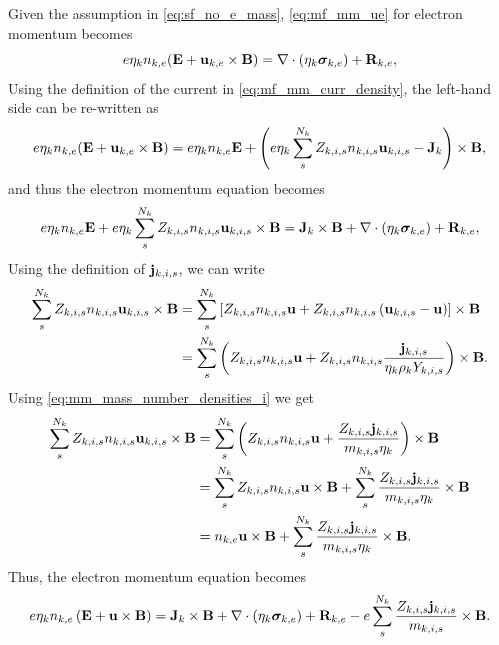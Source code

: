 \documentclass[a4paper,11pt]{report}
\begin{document}
Given the assumption in \cref{eq:sf_no_e_mass}, \cref{eq:mf_mm_ue} for electron momentum becomes
\begin{equation*}
    e \eta_k n_{k,e} ( \mathbf{E} + \mathbf{u}_{k,e} \times \mathbf{B} ) = \nabla \cdot \left( \eta_k \bm \sigma_{k,e} \right) + \mathbf{R}_{k,e},
\end{equation*}
Using the definition of the current in \cref{eq:mf_mm_curr_density}, the left-hand side can be re-written as
\begin{equation*}
    e \eta_k n_{k,e} ( \mathbf{E} + \mathbf{u}_{k,e} \times \mathbf{B} ) = e \eta_k n_{k,e} \mathbf{E} + \left( e \eta_k \sum_s^{N_k} Z_{k,i,s} n_{k,i,s} \mathbf{u}_{k,i,s} - \mathbf{J}_k \right) \times \mathbf{B},
\end{equation*}
and thus the electron momentum equation becomes
\begin{equation*}
    e \eta_k n_{k,e} \mathbf{E} + e \eta_k \sum_s^{N_k} Z_{k,i,s} n_{k,i,s} \mathbf{u}_{k,i,s} \times \mathbf{B} = \mathbf{J}_k \times \mathbf{B} + \nabla \cdot \left( \eta_k \bm \sigma_{k,e} \right) + \mathbf{R}_{k,e},
\end{equation*}
Using the definition of $\mathbf{j}_{k,i,s}$, we can write
\begin{align*}
    \sum_s^{N_k} Z_{k,i,s} n_{k,i,s} \mathbf{u}_{k,i,s} \times \mathbf{B} &= \sum_s^{N_k} \left[ Z_{k,i,s} n_{k,i,s} \mathbf{u} + Z_{k,i,s} n_{k,i,s} \left( \mathbf{u}_{k,i,s} - \mathbf{u} \right) \right] \times \mathbf{B} \\
    &= \sum_s^{N_k} \left( Z_{k,i,s} n_{k,i,s} \mathbf{u} + Z_{k,i,s} n_{k,i,s} \frac{\mathbf{j}_{k,i,s}}{\eta_k \rho_k Y_{k,i,s}} \right) \times \mathbf{B}.
\end{align*}
Using \cref{eq:mm_mass_number_densities_i} we get
\begin{align*}
    \sum_s^{N_k} Z_{k,i,s} n_{k,i,s} \mathbf{u}_{k,i,s} \times \mathbf{B} &= \sum_s^{N_k} \left( Z_{k,i,s} n_{k,i,s} \mathbf{u} + \frac{Z_{k,i,s} \mathbf{j}_{k,i,s}}{m_{k,i,s} \eta_k} \right) \times \mathbf{B} \\
    &= \sum_s^{N_k} Z_{k,i,s} n_{k,i,s} \mathbf{u} \times \mathbf{B} + \sum_s^{N_k} \frac{Z_{k,i,s} \mathbf{j}_{k,i,s}}{m_{k,i,s} \eta_k} \times \mathbf{B} \\
    &= n_{k,e} \mathbf{u} \times \mathbf{B} + \sum_s^{N_k} \frac{Z_{k,i,s} \mathbf{j}_{k,i,s}}{m_{k,i,s} \eta_k} \times \mathbf{B}.
\end{align*}
Thus, the electron momentum equation becomes
\begin{equation*}
    e \eta_k n_{k,e} \left( \mathbf{E} + \mathbf{u} \times \mathbf{B} \right) = \mathbf{J}_k \times \mathbf{B} + \nabla \cdot \left( \eta_k \bm \sigma_{k,e} \right) + \mathbf{R}_{k,e} - e \sum_s^{N_k} \frac{Z_{k,i,s} \mathbf{j}_{k,i,s}}{m_{k,i,s}} \times \mathbf{B}.
\end{equation*}
\end{document}
